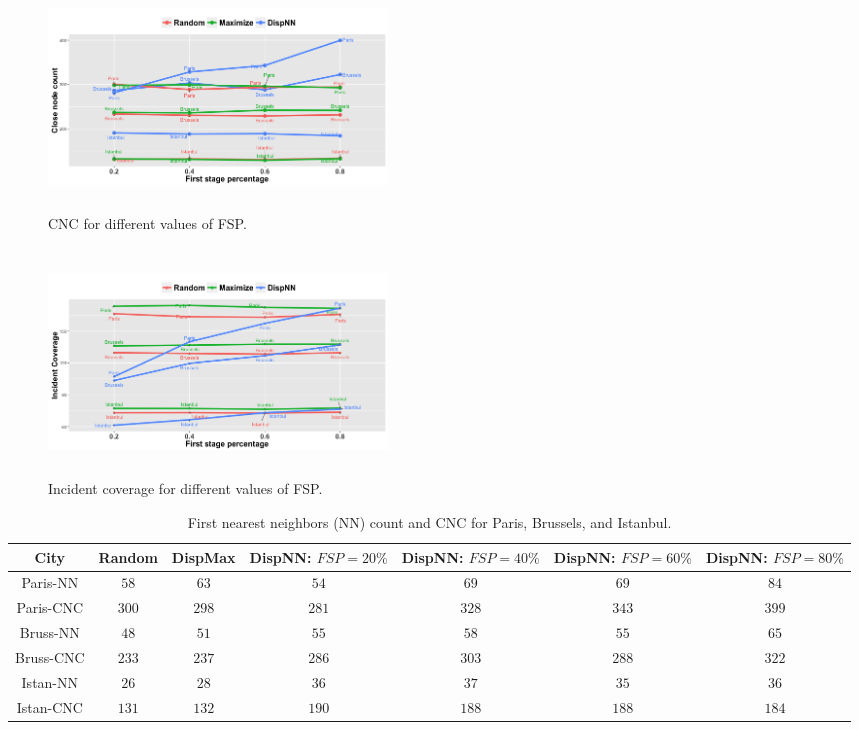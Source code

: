 \documentclass{acm_proc_article-sp}
\begin{document}
\begin{figure}[!h]
\centering
\includegraphics[width=9cm ,height=6cm]{figuresPng/hollaCloseCnt.png}
\caption{CNC for different values of FSP. }
\label{fig: hollaCloseCount}
\end{figure}
\begin{figure}[!h]
\centering
\includegraphics[width=9cm ,height=6cm]{figuresPng/citiesInc.png}
\caption{Incident coverage for different values of FSP. }
\label{fig: hollaIncCoverage}
\end{figure}


\begin{table}[!h]
\centering
\begin{tabulary}{0.5\textwidth}{|C|C|C|C|C|C|C|}
\hline
City & Random & DispMax & DispNN: $FSP = 20\%$ & DispNN: $FSP = 40\%$ & DispNN: $FSP = 60\%$ & DispNN: $FSP = 80\%$  \\ \hline
Paris-NN & $58$ & $63$  & $54$  & $69$ & $69$ & $84$  \\ \hline
Paris-CNC   & $300$ & $298$  & $281$  & $328$ & $343$ & $399$  \\ \hline
Bruss-NN & $48$ & $51$  & $55$  & $58$ & $55$ & $65$  \\ \hline
Bruss-CNC   & $233$ & $237$  & $286$  & $303$ & $288$ & $322$  \\ \hline
Istan-NN & $26$ & $28$  & $36$  & $37$ & $35$ & $36$  \\ \hline
Istan-CNC   & $131$ & $132$  & $190$  & $188$ & $188$ & $184$  \\ \hline
\end{tabulary}
\caption{First nearest neighbors (NN) count and CNC for Paris, Brussels, and Istanbul.}
\label{table:NNParis}
\end{table}
\end{document}

